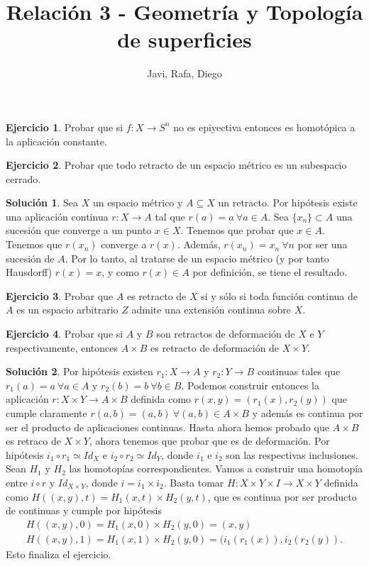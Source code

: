 \documentclass{article}
\theoremstyle{plain}
\theoremstyle{definition}
\newtheorem{exercise}{Ejercicio}
\newtheorem*{sol*}{Solución}
\begin{document}
\title{Relación 3 - Geometría y Topología de superficies }
\author{Javi, Rafa, Diego}
\maketitle
\begin{exercise}
Probar que si $f:X\to S^n$ no es epiyectiva entonces es homotópica a la aplicación constante.
\end{exercise}
\newpage
\begin{exercise}
Probar que todo retracto de un espacio métrico es un subespacio cerrado.
\end{exercise}
\begin{sol*}
Sea $X$ un espacio métrico y $A\subseteq X$ un retracto. Por hipótesis existe una aplicación continua $r:X\to A$ tal que $r(a)=a\ \forall a\in A$. Sea $\{x_n\}\subset A$ una sucesión que converge a un punto $x\in X$. Tenemos que probar que $x\in A$. Tenemos que $r(x_n)$ converge a $r(x)$. Además, $r(x_n)=x_n\ \forall n$ por ser una sucesión de $A$. Por lo tanto, al tratarse de un espacio métrico (y por tanto Hausdorff) $r(x)=x$, y como $r(x)\in A$ por definición, se tiene el resultado. 
\end{sol*}
\newpage
\begin{exercise}
Probar que $A$ es retracto de $X$ si y sólo si toda función continua de $A$ es un espacio arbitrario $Z$ admite una extensión continua sobre $X$.
\end{exercise}
\newpage
\begin{exercise}
Probar que si $A$ y $B$ son retractos de deformación de $X$ e $Y$ respectivamente, entonces $A\times B$ es retracto de deformación de $X\times Y$.
\end{exercise}
\begin{sol*}
Por hipótesis existen $r_1:X\to A$ y $r_2:Y\to B$ continuas tales que $r_1(a)=a\ \forall a\in A$ y $r_2(b)=b\ \forall b\in B$. Podemos construir entonces la aplicación $r:X\times Y\to A\times B$ definida como $r(x,y)=(r_1(x),r_2(y))$ que cumple claramente $r(a,b)=(a,b)\ \forall (a,b)\in A\times B$ y además es continua por ser el producto de aplicaciones continuas. Hasta ahora hemos probado que $A\times B$ es retraco de $X\times Y$, ahora tenemos que probar que es de deformación. Por hipótesis $i_1\circ r_1\simeq Id_X$ e $i_2\circ r_2\simeq Id_Y$, donde $i_1$ e $i_2$ son las respectivas inclusiones. Sean $H_1$ y $H_2$ las homotopías correspondientes. Vamos a construir una homotopía entre $i\circ r$ y $Id_{X\times Y}$, donde $i=i_1\times i_2$. Basta tomar $H:X\times Y\times I\to X\times Y$ definida como $H((x,y),t)=H_1(x,t)\times H_2(y,t)$, que es continua por ser producto de continuas y cumple por hipótesis
\begin{gather*}
H((x,y),0)=H_1(x,0)\times H_2(y,0)= (x,y)\\
H((x,y),1)=H_1(x,1)\times H_2(y,0)= (i_1(r_1(x)),i_2(r_2(y)).
\end{gather*}
Esto finaliza el ejercicio.
\end{sol*}
\end{document}
